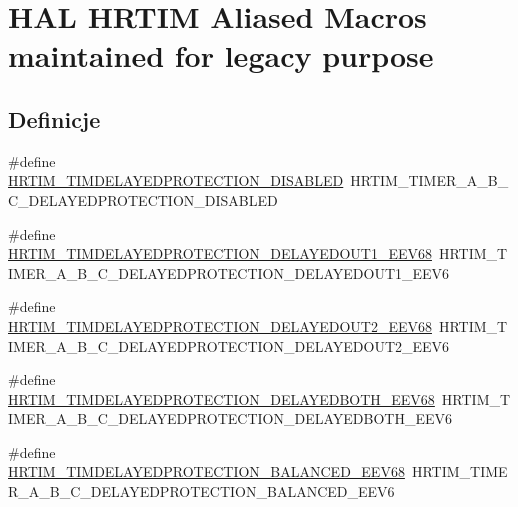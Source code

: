\hypertarget{group___h_a_l___h_r_t_i_m___aliased___macros}{}\section{H\+AL H\+R\+T\+IM Aliased Macros maintained for legacy purpose}
\label{group___h_a_l___h_r_t_i_m___aliased___macros}
\subsection*{Definicje}
\begin{DoxyCompactItemize}
\item 
\#define \hyperlink{group___h_a_l___h_r_t_i_m___aliased___macros_gaf8ea73c0eb91b7d7da248b14d6f82710}{H\+R\+T\+I\+M\+\_\+\+T\+I\+M\+D\+E\+L\+A\+Y\+E\+D\+P\+R\+O\+T\+E\+C\+T\+I\+O\+N\+\_\+\+D\+I\+S\+A\+B\+L\+ED}~H\+R\+T\+I\+M\+\_\+\+T\+I\+M\+E\+R\+\_\+\+A\+\_\+\+B\+\_\+\+C\+\_\+\+D\+E\+L\+A\+Y\+E\+D\+P\+R\+O\+T\+E\+C\+T\+I\+O\+N\+\_\+\+D\+I\+S\+A\+B\+L\+ED
\item 
\#define \hyperlink{group___h_a_l___h_r_t_i_m___aliased___macros_ga0ccedae4619a41d435a4c1913496a2c4}{H\+R\+T\+I\+M\+\_\+\+T\+I\+M\+D\+E\+L\+A\+Y\+E\+D\+P\+R\+O\+T\+E\+C\+T\+I\+O\+N\+\_\+\+D\+E\+L\+A\+Y\+E\+D\+O\+U\+T1\+\_\+\+E\+E\+V68}~H\+R\+T\+I\+M\+\_\+\+T\+I\+M\+E\+R\+\_\+\+A\+\_\+\+B\+\_\+\+C\+\_\+\+D\+E\+L\+A\+Y\+E\+D\+P\+R\+O\+T\+E\+C\+T\+I\+O\+N\+\_\+\+D\+E\+L\+A\+Y\+E\+D\+O\+U\+T1\+\_\+\+E\+E\+V6
\item 
\#define \hyperlink{group___h_a_l___h_r_t_i_m___aliased___macros_ga15dc628c952535647b1c510f046fb635}{H\+R\+T\+I\+M\+\_\+\+T\+I\+M\+D\+E\+L\+A\+Y\+E\+D\+P\+R\+O\+T\+E\+C\+T\+I\+O\+N\+\_\+\+D\+E\+L\+A\+Y\+E\+D\+O\+U\+T2\+\_\+\+E\+E\+V68}~H\+R\+T\+I\+M\+\_\+\+T\+I\+M\+E\+R\+\_\+\+A\+\_\+\+B\+\_\+\+C\+\_\+\+D\+E\+L\+A\+Y\+E\+D\+P\+R\+O\+T\+E\+C\+T\+I\+O\+N\+\_\+\+D\+E\+L\+A\+Y\+E\+D\+O\+U\+T2\+\_\+\+E\+E\+V6
\item 
\#define \hyperlink{group___h_a_l___h_r_t_i_m___aliased___macros_ga2bc2fb991e73a9ef622d0de1933079e5}{H\+R\+T\+I\+M\+\_\+\+T\+I\+M\+D\+E\+L\+A\+Y\+E\+D\+P\+R\+O\+T\+E\+C\+T\+I\+O\+N\+\_\+\+D\+E\+L\+A\+Y\+E\+D\+B\+O\+T\+H\+\_\+\+E\+E\+V68}~H\+R\+T\+I\+M\+\_\+\+T\+I\+M\+E\+R\+\_\+\+A\+\_\+\+B\+\_\+\+C\+\_\+\+D\+E\+L\+A\+Y\+E\+D\+P\+R\+O\+T\+E\+C\+T\+I\+O\+N\+\_\+\+D\+E\+L\+A\+Y\+E\+D\+B\+O\+T\+H\+\_\+\+E\+E\+V6
\item 
\#define \hyperlink{group___h_a_l___h_r_t_i_m___aliased___macros_gacc9d18290b90bd3ba98bc6aade450b32}{H\+R\+T\+I\+M\+\_\+\+T\+I\+M\+D\+E\+L\+A\+Y\+E\+D\+P\+R\+O\+T\+E\+C\+T\+I\+O\+N\+\_\+\+B\+A\+L\+A\+N\+C\+E\+D\+\_\+\+E\+E\+V68}~H\+R\+T\+I\+M\+\_\+\+T\+I\+M\+E\+R\+\_\+\+A\+\_\+\+B\+\_\+\+C\+\_\+\+D\+E\+L\+A\+Y\+E\+D\+P\+R\+O\+T\+E\+C\+T\+I\+O\+N\+\_\+\+B\+A\+L\+A\+N\+C\+E\+D\+\_\+\+E\+E\+V6

\end{DoxyCompactItemize}
